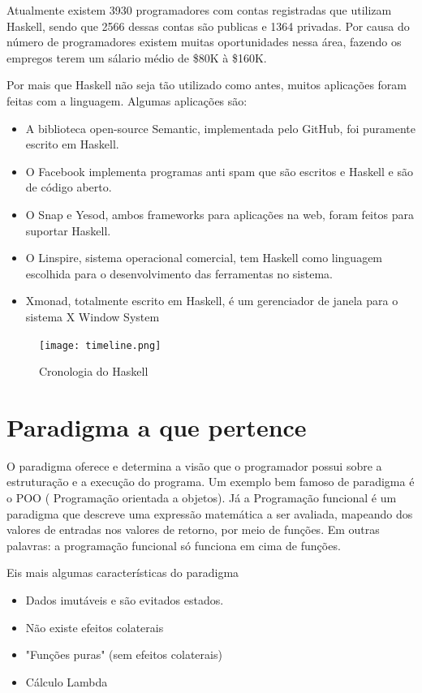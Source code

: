 \documentclass[
  article,			       %
  12pt,				         %
  oneside,			       %
  a4paper,			       %
  english,		       	 %
  brazil,			      	 %
  sumario=tradicional
]{abntex2}
\begin{document}
    Atualmente existem 3930 programadores com contas registradas que utilizam Haskell, sendo que 2566
    dessas contas são publicas e 1364 privadas. Por causa do número de programadores existem muitas 
    oportunidades nessa área, fazendo os empregos terem um sálario médio de \$80K à \$160K.

    Por mais que Haskell não seja tão utilizado como antes, muitos aplicações foram feitas com a linguagem. 
    Algumas aplicações são:

    \begin{itemize}
      \item A biblioteca open-source Semantic, implementada pelo GitHub, foi puramente escrito em Haskell.
      \item O Facebook implementa programas anti spam que são escritos e Haskell e são de código aberto.
      \item O Snap e Yesod, ambos frameworks para aplicações na web, foram feitos para suportar Haskell.
      \item O Linspire, sistema operacional comercial, tem Haskell como linguagem escolhida para o desenvolvimento das ferramentas no sistema.
      \item Xmonad, totalmente escrito em Haskell, é um gerenciador de janela para o sistema X Window System
    \end{itemize}

    \begin{figure}[ht]
      \texttt{[image: timeline.png]}
      \caption{Cronologia do Haskell}
    \end{figure}

    \newpage

    \chapter{Paradigma a que pertence}

    O paradigma oferece e determina a visão que o programador possui sobre a estruturação
    e a execução do programa. Um exemplo bem famoso de paradigma é o POO ( Programação orientada a objetos).
    Já a Programação funcional é um paradigma que descreve uma expressão matemática a ser avaliada,
    mapeando dos valores de entradas nos valores de retorno, por meio de funções. Em outras palavras: 
    a programação funcional só funciona em cima de funções.

    Eis mais algumas características do paradigma
    \begin{itemize}
      \item Dados imutáveis e são evitados estados. 
      \item Não existe efeitos colaterais 
      \item "Funções puras" (sem efeitos colaterais)
      \item Cálculo Lambda
    \end{itemize}
\end{document}
